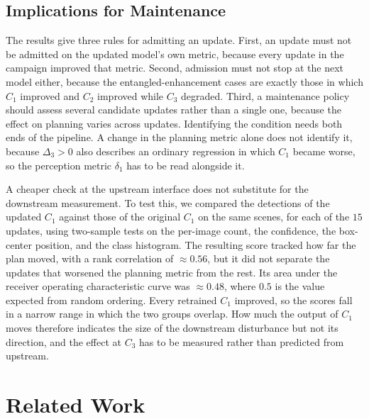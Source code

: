 \documentclass[conference]{IEEEtran}
\begin{document}
\subsection{Implications for Maintenance}
The results give three rules for admitting an update. First, an update must not
be admitted on the updated model's own metric, because every update in the
campaign improved that metric. Second, admission must not stop at the next model
either, because the entangled-enhancement cases are exactly those in which $C_1$
improved and $C_2$ improved while $C_3$ degraded. Third, a maintenance policy
should assess several candidate updates rather than a single one, because the
effect on planning varies across updates. Identifying the condition needs both
ends of the pipeline. A change in the
planning metric alone does not identify it, because $\Delta_3 > 0$ also describes
an ordinary regression in which $C_1$ became worse, so the perception metric
$\delta_1$ has to be read alongside it.

A cheaper check at the upstream interface does not substitute for the downstream
measurement. To test this, we compared the detections of the updated $C_1$
against those of the original $C_1$ on the same scenes, for each of the $15$
updates, using two-sample tests on the per-image count, the confidence, the
box-center position, and the class histogram. The resulting score tracked how far
the plan moved, with a rank correlation of $\approx 0.56$, but it did not
separate the updates that worsened the planning metric from the rest. Its area
under the receiver operating characteristic curve was $\approx 0.48$, where
$0.5$ is the value expected from random ordering. Every retrained $C_1$
improved, so the scores fall in
a narrow range in which the two groups overlap. How much the output of $C_1$
moves therefore indicates the size of the downstream disturbance but not its
direction, and the effect at $C_3$ has to be measured rather than predicted from
upstream.

\section{Related Work}
\label{sec:related}
\end{document}
